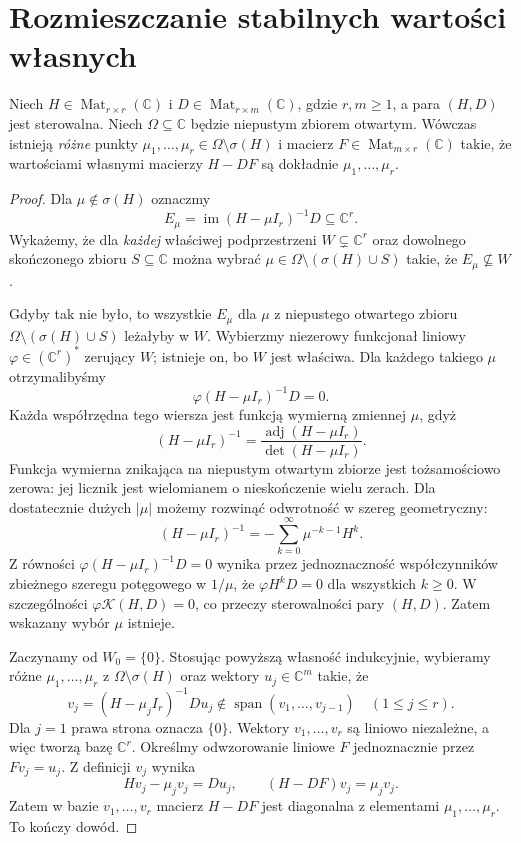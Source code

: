 \section{Rozmieszczanie stabilnych wartości własnych}
\label{sec:lin25-feedback}

\begin{lemat}
\label{lem:lin25-feedback-placement}
Niech
\(H\in\operatorname{Mat}_{r\times r}(\mathbb C)\)
i \(D\in\operatorname{Mat}_{r\times m}(\mathbb C)\),
gdzie \(r,m\ge1\),
a para \((H,D)\)
jest sterowalna.
Niech \(\Omega\subseteq\mathbb C\)
będzie niepustym zbiorem
otwartym.
Wówczas istnieją
\emph{różne} punkty
\(\mu_1,\ldots,\mu_r
 \in\Omega\setminus\sigma(H)\)
i macierz
\(F\in\operatorname{Mat}_{m\times r}(\mathbb C)\)
takie, że wartościami własnymi
macierzy \(H-DF\)
są dokładnie
\(\mu_1,\ldots,\mu_r\).
\end{lemat}
\begin{proof}
Dla
\(\mu\notin\sigma(H)\)
oznaczmy
\[
 E_\mu=\operatorname{im}(H-\mu I_r)^{-1}D
 \subseteq\mathbb C^r.
\]
Wykażemy, że dla
\emph{każdej} właściwej
podprzestrzeni
\(W\subsetneq\mathbb C^r\)
oraz dowolnego skończonego
zbioru \(S\subseteq\mathbb C\)
można wybrać
\(\mu\in\Omega\setminus
 (\sigma(H)\cup S)\)
takie, że
\(E_\mu\not\subseteq W\).

Gdyby tak nie było,
to wszystkie \(E_\mu\)
dla \(\mu\) z niepustego
otwartego zbioru
\(\Omega\setminus(\sigma(H)\cup S)\)
leżałyby w \(W\).
Wybierzmy niezerowy
funkcjonał liniowy
\(\varphi\in(\mathbb C^r)^*\)
zerujący \(W\);
istnieje on, bo \(W\)
jest właściwa.
Dla każdego takiego \(\mu\)
otrzymalibyśmy
\[
 \varphi(H-\mu I_r)^{-1}D=0.
\]
Każda współrzędna tego
wiersza jest funkcją wymierną
zmiennej \(\mu\), gdyż
\[
 (H-\mu I_r)^{-1}
 =\frac{\operatorname{adj}(H-\mu I_r)}
         {\det(H-\mu I_r)}.
\]
Funkcja wymierna znikająca
na niepustym otwartym zbiorze
jest tożsamościowo zerowa:
jej licznik jest wielomianem
o nieskończenie wielu zerach.
Dla dostatecznie dużych
\(|\mu|\) możemy rozwinąć
odwrotność w szereg geometryczny:
\[
 (H-\mu I_r)^{-1}
 =-\sum_{k=0}^{\infty}
      \mu^{-k-1}H^k.
\]
Z równości
\(\varphi(H-\mu I_r)^{-1}D=0\)
wynika przez jednoznaczność
współczynników zbieżnego
szeregu potęgowego
w \(1/\mu\),
że \(\varphi H^kD=0\)
dla wszystkich \(k\ge0\).
W szczególności
\(\varphi\mathcal K(H,D)=0\),
co przeczy sterowalności
pary \((H,D)\).
Zatem wskazany wybór
\(\mu\) istnieje.

Zaczynamy od \(W_0=\{0\}\).
Stosując powyższą własność
indukcyjnie, wybieramy
różne
\(\mu_1,\ldots,\mu_r\)
z \(\Omega\setminus\sigma(H)\)
oraz wektory
\(u_j\in\mathbb C^m\)
takie, że
\[
 v_j=(H-\mu_j I_r)^{-1}Du_j
 \notin\operatorname{span}
       (v_1,\ldots,v_{j-1})
 \quad(1\le j\le r).
\]
Dla \(j=1\) prawa strona
oznacza \(\{0\}\).
Wektory \(v_1,\ldots,v_r\)
są liniowo niezależne,
a więc tworzą bazę
\(\mathbb C^r\).
Określmy odwzorowanie
liniowe \(F\)
jednoznacznie przez
\(Fv_j=u_j\).
Z definicji \(v_j\)
wynika
\[
 Hv_j-\mu_jv_j=Du_j,
 \qquad
 (H-DF)v_j=\mu_jv_j.
\]
Zatem w bazie
\(v_1,\ldots,v_r\)
macierz \(H-DF\)
jest diagonalna
z elementami
\(\mu_1,\ldots,\mu_r\).
To kończy dowód.
\end{proof}

